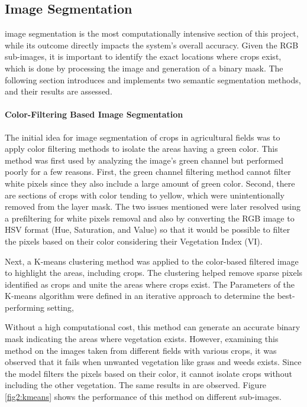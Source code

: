 \documentclass[conference]{IEEEtran}
\begin{document}
\subsection{Image Segmentation}\label{Image Segmentation}
image segmentation is the most computationally intensive section of this project, while its outcome directly impacts the system's overall accuracy. Given the RGB sub-images, it is important to identify the exact locations where crops exist, which is done by processing the image and generation of a binary mask. The following section introduces and implements two semantic segmentation methods, and their results are assessed.

\paragraph{Color-Filtering Based Image Segmentation}
The initial idea for image segmentation of crops in agricultural fields was to apply color filtering methods to isolate the areas having a green color. This method was first used by analyzing the image's green channel but performed poorly for a few reasons. First, the green channel filtering method cannot filter white pixels since they also include a large amount of green color. Second, there are sections of crops with color tending to yellow, which were unintentionally removed from the layer mask. The two issues mentioned were later resolved using a prefiltering for white pixels removal and also by converting the RGB image to HSV format (Hue, Saturation, and Value) so that it would be possible to filter the pixels based on their color considering their Vegetation Index (VI).

Next, a K-means clustering method was applied to the color-based filtered image to highlight the areas, including crops. The clustering helped remove sparse pixels identified as crops and unite the areas where crops exist. The Parameters of the K-means algorithm were defined in an iterative approach to determine the best-performing setting,

Without a high computational cost, this method can generate an accurate binary mask indicating the areas where vegetation exists. However, examining this method on the images taken from different fields with various crops, it was observed that it fails when unwanted vegetation like grass and weeds exists. Since the model filters the pixels based on their color, it cannot isolate crops without including the other vegetation. The same results in
\cite{b5} are observed.
Figure
\ref{fig2:kmeans} shows the performance of this method on different sub-images.
\end{document}
